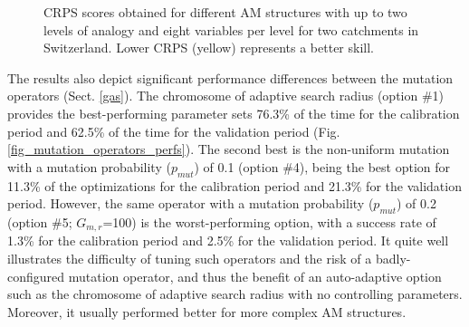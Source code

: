 \documentclass[draft]{agujournal2019}
\begin{document}
\begin{figure}[hbt]
	\noindent{}
	\caption{CRPS scores obtained for different AM structures with up to two levels of analogy and eight variables per level for two catchments in Switzerland. Lower CRPS (yellow) represents a better skill.}
	\label{fig_structures_b}
\end{figure}

The results also depict significant performance differences between the mutation operators (Sect. \ref{gas}). The chromosome of adaptive search radius (option \#1) provides the best-performing parameter sets 76.3\% of the time for the calibration period and 62.5\% of the time for the validation period (Fig. \ref{fig_mutation_operators_perfs}). The second best is the non-uniform mutation with a mutation probability ($p_{mut}$) of 0.1 (option \#4), being the best option for 11.3\% of the optimizations for the calibration period and 21.3\% for the validation period. However, the same operator with a  mutation probability ($p_{mut}$) of 0.2 (option \#5; $G_{m,r}$=100) is the worst-performing option, with a success rate of 1.3\% for the calibration period and 2.5\% for the validation period. It quite well illustrates the difficulty of tuning such operators and the risk of a badly-configured mutation operator, and thus the benefit of an auto-adaptive option such as the chromosome of adaptive search radius with no controlling parameters. Moreover, it usually performed better for more complex AM structures.
\end{document}
